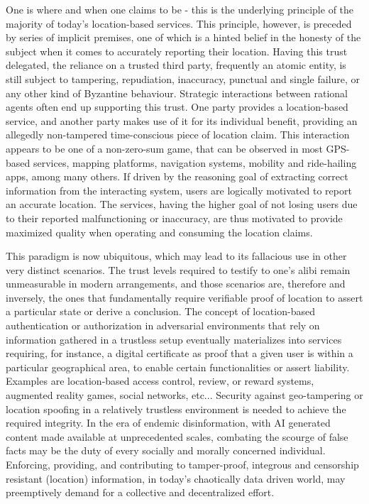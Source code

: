 
One is where and when one claims to be - this is the underlying principle of the majority of today's location-based services. This principle, however, is preceded by series of implicit premises, one of which is a hinted belief in the honesty of the subject when it comes to accurately reporting their location. Having this trust delegated, the reliance on a trusted third party, frequently an atomic entity, is still subject to tampering, repudiation, inaccuracy, punctual and single failure, or any other kind of Byzantine behaviour. Strategic interactions between rational agents often end up supporting this trust. One party provides a location-based service, and another party makes use of it for its individual benefit, providing an allegedly non-tampered time-conscious piece of location claim. This interaction appears to be one of a non-zero-sum game, that can be observed in most GPS-based services, mapping platforms, navigation systems, mobility and ride-hailing apps, among many others. If driven by the reasoning goal of extracting correct information from the interacting system, users are logically motivated to report an accurate location. The services, having the higher goal of not losing users due to their reported malfunctioning or inaccuracy, are thus motivated to provide maximized quality when operating and consuming the location claims. 

This paradigm is now ubiquitous, which may lead to its fallacious use in other very distinct scenarios. The trust levels required to testify to one's alibi remain unmeasurable in modern arrangements, and those scenarios are, therefore and inversely, the ones that fundamentally require verifiable proof of location to assert a particular state or derive a conclusion.  The concept of location-based authentication or authorization in adversarial environments that rely on information gathered in a trustless setup eventually materializes into services requiring, for instance, a digital certificate as proof that a given user is within a particular geographical area, to enable certain functionalities or assert liability. Examples are location-based access control, review, or reward systems, augmented reality games, social networks, etc... Security against geo-tampering or location spoofing in a relatively trustless environment is needed to achieve the required integrity. In the era of endemic disinformation, with AI generated content made available at unprecedented scales, combating the scourge of false facts may be the duty of every socially and morally concerned individual. Enforcing, providing, and contributing to tamper-proof, integrous and censorship resistant (location) information, in today's chaotically data driven world, may preemptively demand for a collective and decentralized effort. 

